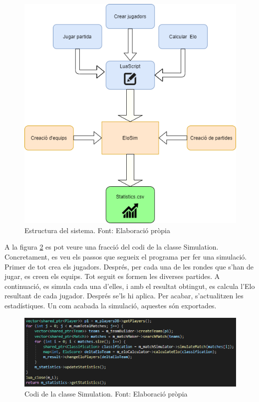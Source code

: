\documentclass[a4paper]{article}
\begin{document}
\begin{figure}[H]
    \centering
    \includegraphics[width=.9\textwidth]{images/TFG-Structure.png}
    \caption[Estructura del sistema]{Estructura del sistema. Font: Elaboració pròpia}
    \label{fig:EloSImEstructure}
\end{figure}


A la figura \ref{fig:SimulationCo} es pot veure una fracció del codi de la classe Simulation. Concretament, es veu els passos que segueix el programa per fer una simulació. Primer de tot crea els jugadors. Després, per cada una de les rondes que s'han de jugar, es creen els equips. Tot seguit es formen les diverses partides. A continuació, es simula cada una d'elles, i amb el resultat obtingut, es calcula l'Elo resultant de cada jugador. Després se'ls hi aplica. Per acabar, s'actualitzen les estadístiques. Un com acabada la simulació, aquestes són exportades.

\begin{figure}[H]
    \centering
    \includegraphics[width=1\textwidth]{images/SimulationCode.png}
    \caption[Codi de la classe Simulation]{Codi de la classe Simulation. Font: Elaboració pròpia}
    \label{fig:SimulationCo}
\end{figure}
\end{document}
